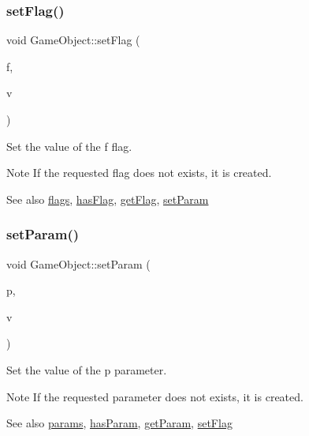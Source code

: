 \subsubsection{\texorpdfstring{set\+Flag()}{setFlag()}}
{\footnotesize\ttfamily void Game\+Object\+::set\+Flag (\begin{DoxyParamCaption}\item[{const Q\+String \&}]{f,  }\item[{bool}]{v }\end{DoxyParamCaption})\hspace{0.3cm}{\ttfamily [inline]}}

Set the value of the {\ttfamily f} flag.

\begin{DoxyNote}{Note}
If the requested flag does not exists, it is created.
\end{DoxyNote}
\begin{DoxySeeAlso}{See also}
\hyperlink{class_game_object_ad6f21f7458be4192a920013dbb3e590e}{flags}, \hyperlink{class_game_object_aeab0a6261090e437f69dfde76a030904}{has\+Flag}, \hyperlink{class_game_object_a16181f773a5685407bc3b314bb34ef71}{get\+Flag}, \hyperlink{class_game_object_a28b8af7f399f1348a4f3130dd21173a1}{set\+Param} 
\end{DoxySeeAlso}
\hypertarget{class_game_object_a28b8af7f399f1348a4f3130dd21173a1}{}\label{class_game_object_a28b8af7f399f1348a4f3130dd21173a1} 
\subsubsection{\texorpdfstring{set\+Param()}{setParam()}}
{\footnotesize\ttfamily void Game\+Object\+::set\+Param (\begin{DoxyParamCaption}\item[{const Q\+String \&}]{p,  }\item[{int}]{v }\end{DoxyParamCaption})\hspace{0.3cm}{\ttfamily [inline]}}

Set the value of the {\ttfamily p} parameter.

\begin{DoxyNote}{Note}
If the requested parameter does not exists, it is created.
\end{DoxyNote}
\begin{DoxySeeAlso}{See also}
\hyperlink{class_game_object_a5d42c482092a7dde84261ac466e815c8}{params}, \hyperlink{class_game_object_aefe5673b8484d485b418b0ba6a3314dd}{has\+Param}, \hyperlink{class_game_object_a328ee07594f27b294fcac02099be393b}{get\+Param}, \hyperlink{class_game_object_ae7984096fc518b15c0b080c543e4c42f}{set\+Flag} 
\end{DoxySeeAlso}
\hypertarget{class_game_object_a2130d5674df041b5a7eaf987f9b1e642}{}\label{class_game_object_a2130d5674df041b5a7eaf987f9b1e642} 
